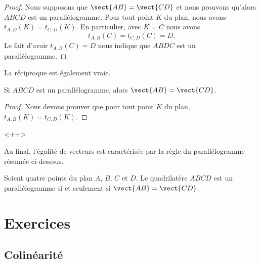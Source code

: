 \begin{proof}
    Nous supposons que \( \vect{ AB }=\vect{ CD }\) et nous prouvons qu'alors \( ABCD\) est un parallélogramme.  Pour tout point \( K\) du plan, nous avons \( t_{A,D}(K)=t_{C,D}(K)\). En particulier, avec \( K=C\) nous avons
    \begin{equation}
        t_{A,B}(C)=t_{C,D}(C)=D.
    \end{equation}
    Le fait d'avoir \( t_{A,B}(C)=D\) nous indique que \( ABDC\) est un parallélogramme.
\end{proof}

La réciproque est également vraie.
\begin{propriete}
    Si \( ABCD\) est un parallélogramme, alors \( \vect{ AB }=\vect{ CD }\).
\end{propriete}

\begin{proof}
    Nous devons prouver que pour tout point \( K\) du plan, \( t_{A,B}(K)=t_{C,D}(K)\).
\end{proof}
<++>

Au final, l'égalité de vecteurs est caractérisée par la règle du parallélogramme résumée ci-dessous.
\begin{propriete}
    Soient quatre points du plan \( A\), \( B\), \( C\) et \( D\). Le quadrilatère \( ABCD\) est un parallélogramme si et seulement si \( \vect{ AB }=\vect{ CD }\).
\end{propriete}

\section{Exercices}


\subsection{Colinéarité}

